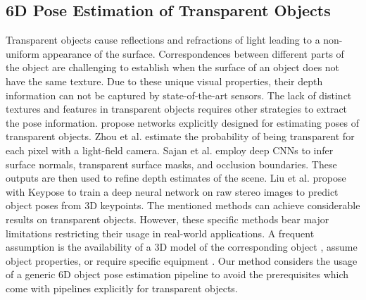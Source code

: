 \subsection{6D Pose Estimation of Transparent Objects}
Transparent objects cause reflections and refractions of light leading to a non-uniform appearance of the surface.
Correspondences between different parts of the object are challenging to establish when the surface of an object does not have the same texture. 
Due to these unique visual properties, their depth information can not be captured by state-of-the-art sensors.
The lack of distinct textures and features in transparent objects requires other strategies to extract the pose information.
\cite{liu2020keypose, chen2022clearpose, zhang2022transnet} propose networks explicitly designed for estimating poses of transparent objects. 
Zhou et al. \cite{zhou2019glassloc} estimate the probability of being transparent for each pixel with a light-field camera.
Sajan et al. \cite{sajjan2020cleargrasp} employ deep CNNs to infer surface normals, transparent surface masks, and occlusion boundaries. 
These outputs are then used to refine depth estimates of the scene. 
Liu et al. \cite{liu2020keypose} propose with Keypose to train a deep neural network on raw stereo images to predict object poses from 3D keypoints.
The mentioned methods can achieve considerable results on transparent objects.
However, these specific methods bear major limitations restricting their usage in real-world applications.
A frequent assumption is the availability of a 3D model of the corresponding object \cite{glassware, transparent_clutter, mobile_platform}, assume object properties, or require specific equipment \cite{zhou2019glassloc}.
Our method considers the usage of a generic 6D object pose estimation pipeline to avoid the prerequisites which come with pipelines explicitly for transparent objects.

